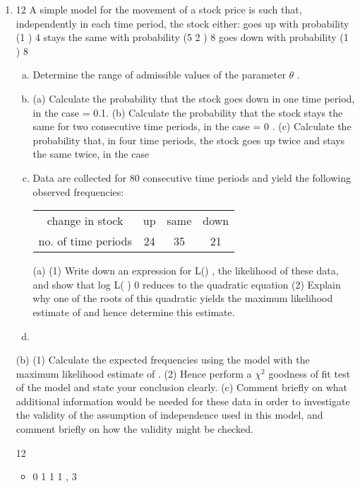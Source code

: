 \documentclass[a4paper,12pt]{article}
\begin{document}
\begin{enumerate}
\item 12 A simple model for the movement of a stock price is such that, independently in each
time period, the stock either:
goes up with probability (1 )
4
stays the same with probability (5 2 )
8
goes down with probability (1 )
8
\begin{enumerate}[(a)]

\item Determine the range of admissible values of the parameter $\theta$ . 
\item (a) Calculate the probability that the stock goes down in one time period, in the case  = 0.1.
(b) Calculate the probability that the stock stays the same for two consecutive time periods, in the case  = 0 .
(c) Calculate the probability that, in four time periods, the stock goes up twice and stays the same twice, in the case  %
\item Data are collected for 80 consecutive time periods and yield the following
observed frequencies:

\begin{center}
\begin{tabular}{|c|c|c|c|}
change in stock & up & same &  down\\
no. of time periods & 24 & 35 & 21 \\
\end{tabular}
\end{center}

(a) (1) Write down an expression for L() , the likelihood of these
data, and show that
log L( ) 0 %
reduces to the quadratic equation
(2) Explain why one of the roots of this quadratic yields the
maximum likelihood estimate of  and hence determine this
estimate. 
    \item 
\end{enumerate}
(b) (1) Calculate the expected frequencies using the model with the
maximum likelihood estimate of .
(2) Hence perform a $\chi^2$ goodness of fit test of the model and state
your conclusion clearly. 
(c) Comment briefly on what additional information would be needed for
these data in order to investigate the validity of the assumption of
independence used in this model, and comment briefly on how the
validity might be checked. 


12 
\begin{itemize}
\item 0 1 1 1 , 3


\end{itemize}
\end{enumerate}
\end{document}

